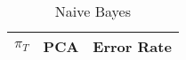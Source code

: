 \begin{center}
\begin{longtable}{|c|c|c|}
\caption{Naive Bayes}\label{tab:mvg_naiveacctable}\\
\hline
$\pi_T$ & PCA & Error Rate\\
\hline
\hline
\end{longtable}
\end{center}

